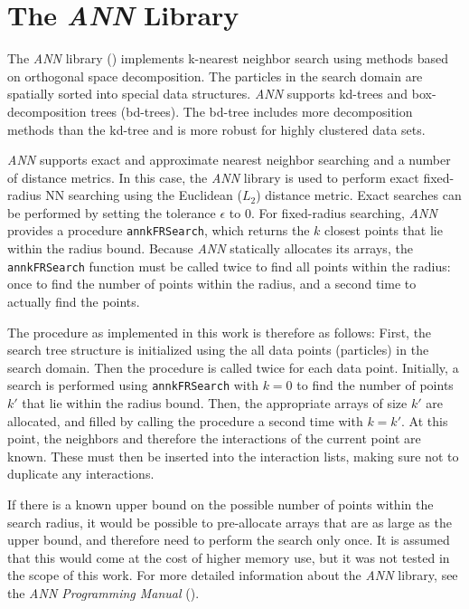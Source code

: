 \section{The {\itshape ANN} Library}
\label{SECTION:ANN}

The {\itshape ANN} library (\cite{ANN10}) implements k-nearest neighbor search using methods based on orthogonal space decomposition. The particles in the search domain are spatially sorted into special data structures. {\itshape ANN} supports kd-trees and box-decomposition trees (bd-trees). The bd-tree includes more decomposition methods than the kd-tree and is more robust for highly clustered data sets. 

{\itshape ANN} supports exact and approximate nearest neighbor searching and a number of distance metrics. In this case, the {\itshape ANN} library is used to perform exact fixed-radius NN searching using the Euclidean ($L_2$) distance metric. Exact searches can be performed by setting the tolerance $\epsilon$ to 0. For fixed-radius searching, {\itshape ANN} provides a procedure \texttt{annkFRSearch}, which returns the $k$ closest points that lie within the radius bound. Because {\itshape ANN} statically allocates its arrays, the \texttt{annkFRSearch} function must be called twice to find all points within the radius: once to find the number of points within the radius, and a second time to actually find the points.

The procedure as implemented in this work is therefore as follows:  First, the search tree structure is initialized using the all data points (particles) in the search domain. Then the  procedure is called twice for each data point. Initially, a search is performed using \texttt{annkFRSearch} with $k = 0$ to find the number of points $k'$ that lie within the radius bound.  Then, the appropriate arrays of size $k'$ are allocated, and filled by calling the procedure a second time with $k = k'$. At this point, the neighbors and therefore the interactions of the current point are known. These must then be inserted into the interaction lists, making sure not to duplicate any interactions.

If there is a known upper bound on the possible number of points within the search radius, it would be possible to pre-allocate arrays that are as large as the upper bound, and therefore need to perform the search only once. It is assumed that this would come at the cost of higher memory use, but it was not tested in the scope of this work. For more detailed information about the {\itshape ANN} library, see the {\itshape ANN Programming Manual} (\cite{Mount10}).

